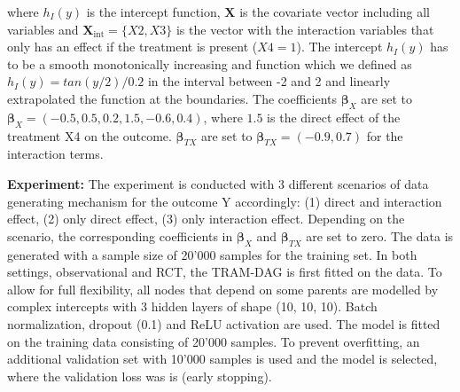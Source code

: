 where $h_I(y)$ is the intercept function, $\mathbf{X}$ is the covariate vector including all variables and $\mathbf{X}_{\text{int}} = \{X2, X3\}$ is the vector with the interaction variables that only has an effect if the treatment is present ($X4 = 1$). The intercept $h_I(y)$ has to be a smooth monotonically increasing and function which we defined as $h_I(y) = tan(y/2) / 0.2$ in the interval between -2 and 2 and linearly extrapolated the function at the boundaries. The coefficients $\boldsymbol{\beta}_X$ are set to $\boldsymbol{\beta}_X = (-0.5, 0.5, 0.2, 1.5, -0.6, 0.4)$, where $1.5$ is the direct effect of the treatment X4 on the outcome. $\boldsymbol{\beta}_{TX}$ are set to $\boldsymbol{\beta}_{TX} = (-0.9, 0.7)$ for the interaction terms.


\textbf{Experiment: } The experiment is conducted with 3 different scenarios of data generating mechanism for the outcome Y accordingly: (1) direct and interaction effect, (2) only direct effect, (3) only interaction effect. Depending on the scenario, the corresponding coefficients in $\boldsymbol{\beta}_{X}$ and $\boldsymbol{\beta}_{TX}$ are set to zero. The data is generated with a sample size of 20'000 samples for the training set. In both settings, observational and RCT, the TRAM-DAG is first fitted on the data. To allow for full flexibility, all nodes that depend on some parents are modelled by complex intercepts with 3 hidden layers of shape (10, 10, 10). Batch normalization, dropout (0.1) and ReLU activation are used. The model is fitted on the training data consisting of 20'000 samples. To prevent overfitting, an additional validation set with 10'000 samples is used and the model is selected, where the validation loss was is (early stopping).


